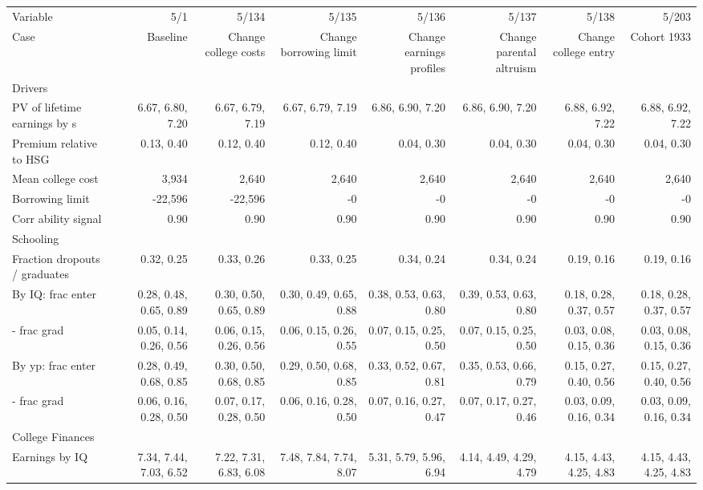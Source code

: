 \begin{tabular}{lrrrrrrr}
\hline
Variable & 5/1  & 5/134  & 5/135  & 5/136  & 5/137  & 5/138  & 5/203  \\ 
Case & Baseline  & Change college costs  & Change borrowing limit  & Change earnings profiles  & Change parental altruism  & Change college entry  & Cohort 1933  \\ 
Drivers &   &   &   &   &   &   &   \\ 
PV of lifetime earnings by s & 6.67, 6.80, 7.20  & 6.67, 6.79, 7.19  & 6.67, 6.79, 7.19  & 6.86, 6.90, 7.20  & 6.86, 6.90, 7.20  & 6.88, 6.92, 7.22  & 6.88, 6.92, 7.22  \\ 
Premium relative to HSG & 0.13, 0.40  & 0.12, 0.40  & 0.12, 0.40  & 0.04, 0.30  & 0.04, 0.30  & 0.04, 0.30  & 0.04, 0.30  \\ 
Mean college cost & 3,934  & 2,640  & 2,640  & 2,640  & 2,640  & 2,640  & 2,640  \\ 
Borrowing limit & -22,596  & -22,596  & -0  & -0  & -0  & -0  & -0  \\ 
Corr ability signal & 0.90  & 0.90  & 0.90  & 0.90  & 0.90  & 0.90  & 0.90  \\ 
\hline
Schooling &   &   &   &   &   &   &   \\ 
Fraction dropouts / graduates & 0.32, 0.25  & 0.33, 0.26  & 0.33, 0.25  & 0.34, 0.24  & 0.34, 0.24  & 0.19, 0.16  & 0.19, 0.16  \\ 
By IQ: frac enter & 0.28, 0.48, 0.65, 0.89  & 0.30, 0.50, 0.65, 0.89  & 0.30, 0.49, 0.65, 0.88  & 0.38, 0.53, 0.63, 0.80  & 0.39, 0.53, 0.63, 0.80  & 0.18, 0.28, 0.37, 0.57  & 0.18, 0.28, 0.37, 0.57  \\ 
- frac grad & 0.05, 0.14, 0.26, 0.56  & 0.06, 0.15, 0.26, 0.56  & 0.06, 0.15, 0.26, 0.55  & 0.07, 0.15, 0.25, 0.50  & 0.07, 0.15, 0.25, 0.50  & 0.03, 0.08, 0.15, 0.36  & 0.03, 0.08, 0.15, 0.36  \\ 
By yp: frac enter & 0.28, 0.49, 0.68, 0.85  & 0.30, 0.50, 0.68, 0.85  & 0.29, 0.50, 0.68, 0.85  & 0.33, 0.52, 0.67, 0.81  & 0.35, 0.53, 0.66, 0.79  & 0.15, 0.27, 0.40, 0.56  & 0.15, 0.27, 0.40, 0.56  \\ 
- frac grad & 0.06, 0.16, 0.28, 0.50  & 0.07, 0.17, 0.28, 0.50  & 0.06, 0.16, 0.28, 0.50  & 0.07, 0.16, 0.27, 0.47  & 0.07, 0.17, 0.27, 0.46  & 0.03, 0.09, 0.16, 0.34  & 0.03, 0.09, 0.16, 0.34  \\ 
\hline
College Finances &   &   &   &   &   &   &   \\ 
Earnings by IQ & 7.34, 7.44, 7.03, 6.52  & 7.22, 7.31, 6.83, 6.08  & 7.48, 7.84, 7.74, 8.07  & 5.31, 5.79, 5.96, 6.94  & 4.14, 4.49, 4.29, 4.79  & 4.15, 4.43, 4.25, 4.83  & 4.15, 4.43, 4.25, 4.83  \\ 

\end{tabular}
